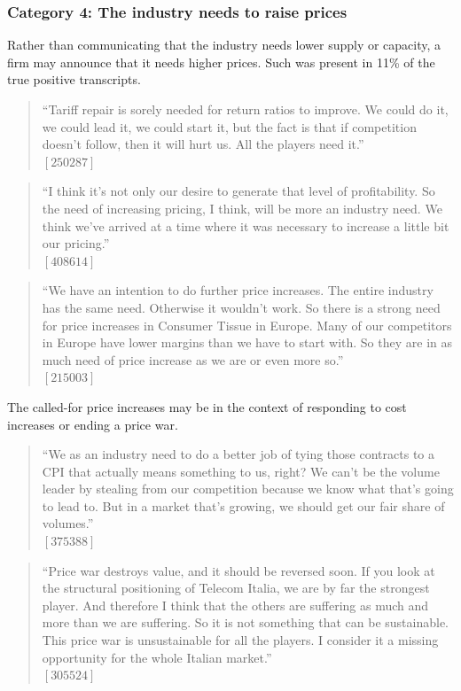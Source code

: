 \subsubsection{Category 4: The industry needs to raise prices}
Rather than communicating that the industry needs lower supply or capacity, a firm may announce that it needs higher prices. Such was present in 11\% of the true positive transcripts.

\begin{quote}
``Tariff repair is sorely needed for return ratios to improve. We could do it, we could lead it, we could start it, but the fact is that if competition doesn't follow, then it will hurt us. All the players need it.'' \\
$[250287]$
\end{quote}

\begin{quote}
``I think it's not only our desire to generate that level of profitability. So the need of increasing pricing, I think, will be more an industry need. We think we've arrived at a time where it was necessary to increase a little bit our pricing.'' \\
$[408614]$
\end{quote}

\begin{quote}
``We have an intention to do further price increases. The entire industry has the same need. Otherwise it wouldn't work. So there is a strong need for price increases in Consumer Tissue in Europe. Many of our competitors in Europe have lower margins than we have to start with. So they are in as much need of price increase as we are or even more so.'' \\
$[215003]$
\end{quote}

The called-for price increases may be in the context of responding to cost increases or ending a price war.

\begin{quote}
``We as an industry need to do a better job of tying those contracts to a CPI that actually means something to us, right? We can't be the volume leader by stealing from our competition because we know what that's going to lead to. But in a market that's growing, we should get our fair share of volumes.'' \\
$[375388]$
\end{quote}

\begin{quote}
``Price war destroys value, and it should be reversed soon. If you look at the structural positioning of Telecom Italia, we are by far the strongest player. And therefore I think that the others are suffering as much and more than we are suffering. So it is not something that can be sustainable. This price war is unsustainable for all the players. I consider it a missing opportunity for the whole Italian market.'' \\
$[305524]$
\end{quote}

